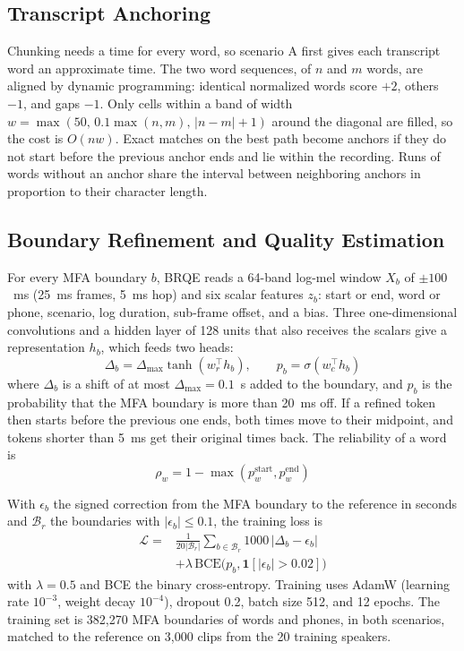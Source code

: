 \documentclass[conference,a4paper]{IEEEtran}
\begin{document}
\subsection{Transcript Anchoring}\label{sec:anchor}
Chunking needs a time for every word, so scenario A first gives each transcript word an approximate time. The two word sequences, of $n$ and $m$ words, are aligned by dynamic programming: identical normalized words score $+2$, others $-1$, and gaps $-1$. Only cells within a band of width $w=\max(50,\,0.1\max(n,m),\,|n-m|+1)$ around the diagonal are filled, so the cost is $O(nw)$. Exact matches on the best path become anchors if they do not start before the previous anchor ends and lie within the recording. Runs of words without an anchor share the interval between neighboring anchors in proportion to their character length.

\subsection{Boundary Refinement and Quality Estimation}\label{sec:brqe}
For every MFA boundary $b$, BRQE reads a 64-band log-mel window $X_b$ of $\pm100$~ms (25~ms frames, 5~ms hop) and six scalar features $z_b$: start or end, word or phone, scenario, log duration, sub-frame offset, and a bias. Three one-dimensional convolutions and a hidden layer of 128 units that also receives the scalars give a representation $h_b$, which feeds two heads:
\begin{equation}
\Delta_b=\Delta_{\max}\tanh(w_r^{\top}h_b),\qquad
p_b=\sigma(w_c^{\top}h_b)
\label{eq:brqe}
\end{equation}
where $\Delta_b$ is a shift of at most $\Delta_{\max}=0.1$~s added to the boundary, and $p_b$ is the probability that the MFA boundary is more than 20~ms off. If a refined token then starts before the previous one ends, both times move to their midpoint, and tokens shorter than 5~ms get their original times back. The reliability of a word is
\begin{equation}
\rho_w = 1-\max(p_w^{\mathrm{start}},p_w^{\mathrm{end}})
\label{eq:reliability}
\end{equation}

With $\epsilon_b$ the signed correction from the MFA boundary to the reference in seconds and $\mathcal{B}_r$ the boundaries with $|\epsilon_b|\le0.1$, the training loss is
\begin{equation}
\begin{split}
\mathcal{L}={}&\frac{1}{20\lvert\mathcal{B}_r\rvert}\sum_{b\in\mathcal{B}_r}1000\,\lvert\Delta_b-\epsilon_b\rvert\\
&+\lambda\,\mathrm{BCE}\bigl(p_b,\mathbf{1}[\lvert\epsilon_b\rvert>0.02]\bigr)
\end{split}
\label{eq:loss}
\end{equation}
with $\lambda=0.5$ and BCE the binary cross-entropy. Training uses AdamW (learning rate $10^{-3}$, weight decay $10^{-4}$), dropout 0.2, batch size 512, and 12 epochs. The training set is 382,270 MFA boundaries of words and phones, in both scenarios, matched to the reference on 3,000 clips from the 20 training speakers.
\end{document}
